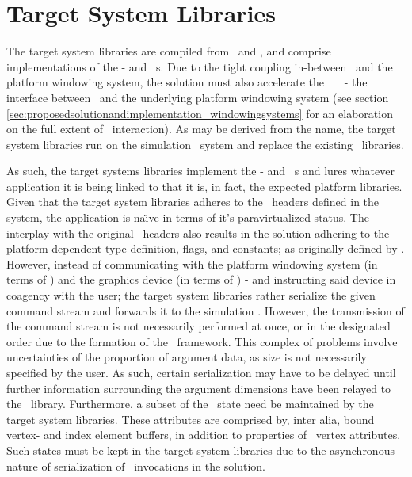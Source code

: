 

\section{Target System Libraries}
\label{sec:proposedsolutionandimplementation_targetsystemlibraries}
The target system libraries are compiled from \dvttermc\ and \dvttermcplusplus , and comprise implementations of the \dvttermegl - and \dvttermopengl\ \dvttermapi s.
Due to the tight coupling in-between \dvttermopengl\ and the platform windowing system, the solution must also accelerate the \dvttermkhronos\ \dvttermegl\ \dvttermapi\ - the interface between \dvttermopengl\ and the underlying platform windowing system (see section \ref{sec:proposedsolutionandimplementation_windowingsystems} for an elaboration on the full extent of \dvttermegl\ interaction).
As may be derived from the name, the target system libraries run on the simulation \dvttermtarget\ system and replace the existing \dvttermkhronos\ libraries.

As such, the target systems libraries implement the \dvttermegl - and \dvttermopenglestwopointo\ \dvttermapi s and lures whatever application it is being linked to that it is, in fact, the expected platform libraries.
Given that the target system libraries adheres to the \dvttermopengl\ headers defined in the system, the application is na\"{\i}ve in terms of it's paravirtualized status.
The interplay with the original \dvttermopengles\ headers also results in the solution adhering to the platform-dependent type definition, flags, and constants; as originally defined by \dvttermkhronos .
However, instead of communicating with the platform windowing system (in terms of \dvttermegl ) and the graphics device (in terms of \dvttermopengl ) - and instructing said device in coagency with the user; the target system libraries rather serialize the given command stream and forwards it to the simulation \dvttermhost .
However, the transmission of the command stream is not necessarily performed at once, or in the designated order due to the formation of the \dvttermopenglestwopointo\ framework.
This complex of problems involve uncertainties of the proportion of argument data, as size is not necessarily specified by the user.
As such, certain serialization may have to be delayed until further information surrounding the argument dimensions have been relayed to the \dvttermopengl\ library.
Furthermore, a subset of the \dvttermopengl\ state need be maintained by the target system libraries.
These attributes are comprised by, inter alia, bound vertex- and index element buffers, in addition to properties of \dvttermopengl\ vertex attributes.
Such states must be kept in the target system libraries due to the asynchronous nature of serialization of \dvttermopengl\ invocations in the  solution.

